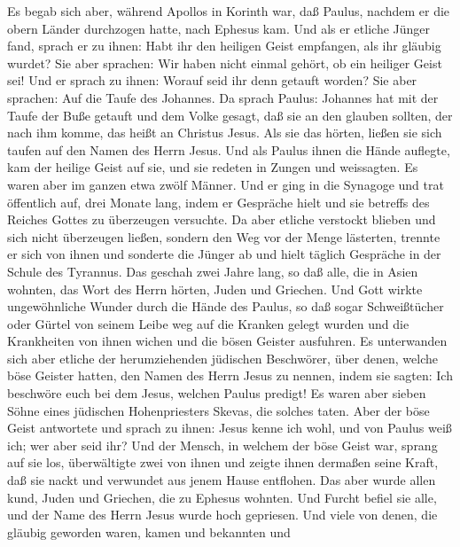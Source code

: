  Es begab sich aber, während Apollos in Korinth war, daß
Paulus, nachdem er die obern Länder durchzogen hatte, nach Ephesus kam.
Und als er etliche Jünger fand, sprach er zu ihnen:  Habt
ihr den heiligen Geist empfangen, als ihr gläubig wurdet? Sie aber
sprachen: Wir haben nicht einmal gehört, ob ein heiliger Geist sei!
 Und er sprach zu ihnen: Worauf seid ihr denn getauft
worden? Sie aber sprachen: Auf die Taufe des Johannes.  Da
sprach Paulus: Johannes hat mit der Taufe der Buße getauft und dem Volke
gesagt, daß sie an den glauben sollten, der nach ihm komme, das heißt an
Christus Jesus.  Als sie das hörten, ließen sie sich
taufen auf den Namen des Herrn Jesus.  Und als Paulus
ihnen die Hände auflegte, kam der heilige Geist auf sie, und sie redeten
in Zungen und weissagten.  Es waren aber im ganzen etwa
zwölf Männer.  Und er ging in die Synagoge und trat
öffentlich auf, drei Monate lang, indem er Gespräche hielt und sie
betreffs des Reiches Gottes zu überzeugen versuchte.  Da
aber etliche verstockt blieben und sich nicht überzeugen ließen, sondern
den Weg vor der Menge lästerten, trennte er sich von ihnen und sonderte
die Jünger ab und hielt täglich Gespräche in der Schule des Tyrannus.
 Das geschah zwei Jahre lang, so daß alle, die in Asien
wohnten, das Wort des Herrn hörten, Juden und Griechen. 
Und Gott wirkte ungewöhnliche Wunder durch die Hände des Paulus,
 so daß sogar Schweißtücher oder Gürtel von seinem Leibe
weg auf die Kranken gelegt wurden und die Krankheiten von ihnen wichen
und die bösen Geister ausfuhren.  Es unterwanden sich
aber etliche der herumziehenden jüdischen Beschwörer, über denen, welche
böse Geister hatten, den Namen des Herrn Jesus zu nennen, indem sie
sagten: Ich beschwöre euch bei dem Jesus, welchen Paulus predigt!
 Es waren aber sieben Söhne eines jüdischen
Hohenpriesters Skevas, die solches taten.  Aber der böse
Geist antwortete und sprach zu ihnen: Jesus kenne ich wohl, und von
Paulus weiß ich; wer aber seid ihr?  Und der Mensch, in
welchem der böse Geist war, sprang auf sie los, überwältigte zwei von
ihnen und zeigte ihnen dermaßen seine Kraft, daß sie nackt und verwundet
aus jenem Hause entflohen.  Das aber wurde allen kund,
Juden und Griechen, die zu Ephesus wohnten. Und Furcht befiel sie alle,
und der Name des Herrn Jesus wurde hoch gepriesen.  Und
viele von denen, die gläubig geworden waren, kamen und bekannten und
